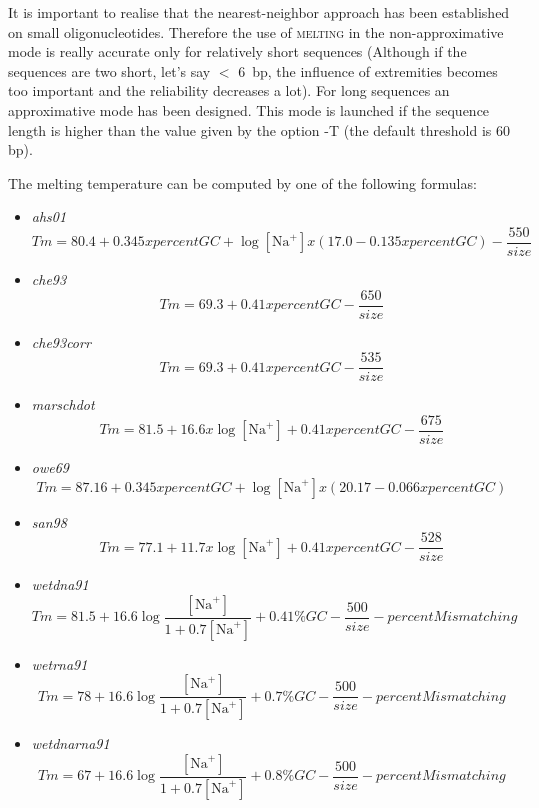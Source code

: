 \documentclass{article}
\begin{document}
It is important to realise that the nearest-neighbor approach has been established  
on small oligonucleotides. Therefore the use of \textsc{melting} in the non-approximative  
mode is really accurate only for relatively short sequences (Although if the sequences are 
two short, let's say $<$ 6~bp, the influence of extremities becomes too important and the  
reliability decreases a lot). For long sequences an approximative mode has been designed. 
This mode is launched if the sequence length is higher than the value given by the option -T 
(the default threshold is 60 bp).
 
The melting temperature can be computed by one of the following formulas:   
\begin{itemize}
\item \textit{ahs01}
\begin{displaymath}
Tm = 80.4 + 0.345 x percentGC + \log[\mbox{Na}^+] x (17.0 - 0.135 x percentGC) - \frac{550}{size}
\end{displaymath}
\item \textit{che93}
\begin{displaymath}
Tm = 69.3 + 0.41 x percentGC - \frac{650}{size}
\end{displaymath}
\item \textit{che93corr}
\begin{displaymath}
Tm = 69.3 + 0.41 x percentGC - \frac{535}{size}
\end{displaymath}
\item \textit{marschdot}
\begin{displaymath}
Tm = 81.5 + 16.6 x \log[\mbox{Na}^+] + 0.41 x percentGC - \frac{675}{size}
\end{displaymath}
\item \textit{owe69}
\begin{displaymath}
Tm = 87.16 + 0.345 x percentGC + \log[\mbox{Na}^+] x (20.17 - 0.066 x percentGC)
\end{displaymath}
\item \textit{san98}
\begin{displaymath}
Tm = 77.1 + 11.7 x \log[\mbox{Na}^+] + 0.41 x percentGC - \frac{528}{size}
\end{displaymath}
\item \textit{wetdna91}
\begin{displaymath}
Tm = 81.5 + 16.6\log\frac{[\mbox{Na}^+]}{1+0.7[\mbox{Na}^+]} + 0.41\% GC - \frac{500}{size} 
- percentMismatching
\end{displaymath}
\item \textit{wetrna91}
\begin{displaymath}
Tm = 78 + 16.6\log\frac{[\mbox{Na}^+]}{1+0.7[\mbox{Na}^+]} + 0.7\% GC - \frac{500}{size}
- percentMismatching
\end{displaymath}
\item \textit{wetdnarna91}
\begin{displaymath}
Tm = 67 + 16.6\log\frac{[\mbox{Na}^+]}{1+0.7[\mbox{Na}^+]} + 0.8\% GC - \frac{500}{size}
- percentMismatching
\end{displaymath}
\end{itemize}
\end{document}
